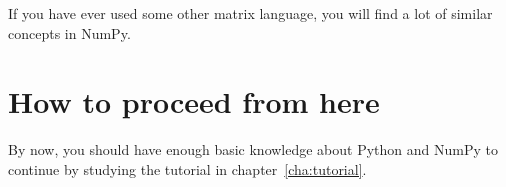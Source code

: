 If you have ever used some other matrix language, you will find a lot of similar concepts in NumPy.




\section{How to proceed from here}
By now, you should have enough basic knowledge about Python and NumPy to continue by studying the \pyf tutorial in chapter~\ref{cha:tutorial}.

